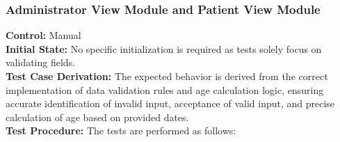 \documentclass[12pt, titlepage]{article}
\begin{document}
\subsubsection{Administrator View Module and Patient View Module}

  \textbf{Control:} Manual\\
  \textbf{Initial State:} No specific initialization is required as tests solely focus on validating fields.\\
  \textbf{Test Case Derivation:} The expected behavior is derived from the correct implementation of data validation rules and age calculation logic, ensuring accurate identification of invalid input, acceptance of valid input, and precise calculation of age based on provided dates.\\
  \textbf{Test Procedure:} The tests are performed as follows:\\
\end{document}
